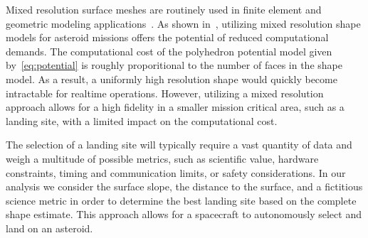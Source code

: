 Mixed resolution surface meshes are routinely used in finite element and geometric modeling applications~\cite{botsch2010}.
As shown in~\cite{mcmahon2017}, utilizing mixed resolution shape models for asteroid missions offers the potential of reduced computational demands.
The computational cost of the polyhedron potential model given by~\cref{eq:potential} is roughly proporitional to the number of faces in the shape model.
As a result, a uniformly high resolution shape would quickly become intractable for realtime operations.
However, utilizing a mixed resolution approach allows for a high fidelity in a smaller mission critical area, such as a landing site, with a limited impact on the computational cost.

The selection of a landing site will typically require a vast quantity of data and weigh a multitude of possible metrics, such as scientific value, hardware constraints, timing and communication limits, or safety considerations. 
In our analysis we consider the surface slope, the distance to the surface, and a fictitious science metric in order to determine the best landing site based on the complete shape estimate.
This approach allows for a spacecraft to autonomously select and land on an asteroid.

